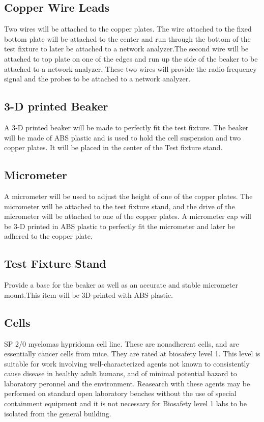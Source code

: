 \documentclass[journal]{IEEEtran}
\begin{document}
\subsection{Copper Wire Leads}
Two wires will be attached to the copper plates. The wire attached to the fixed bottom plate will be attached to the center and run through the bottom of the test fixture to later be attached to a network analyzer.The second wire will be attached to top plate on one of the edges and run up the side of the beaker to be attached to a network analyzer. These two wires will provide the radio frequency signal and the probes to be attached to a network analyzer.

\subsection{3-D printed Beaker}
A 3-D printed beaker will be made to perfectly fit the test fixture. The beaker will be made of ABS plastic and is used to hold the cell suspension and two copper plates. It will be placed in the center of the Test fixture stand.

\subsection{Micrometer}
A micrometer will be used to adjust the height of one of the copper plates. The micrometer will be attached to the test fixture stand, and the drive of the micrometer will be attached to one of the copper plates. A micrometer cap will be 3-D printed in ABS plastic to perfectly fit the micrometer and later be adhered to the copper plate.

\subsection{Test Fixture Stand}
Provide a base for the beaker as well as an accurate and stable micrometer mount.This item will be 3D printed with ABS plastic.

\subsection{Cells}
SP 2/0 myelomas hypridoma cell line. These are nonadherent cells, and are essentially cancer cells from mice.\cite{mouse-myeloma-hybridoma-strain} They are rated at biosafety level 1. This level is suitable for work involving well-characterized agents not known to consistently cause disease in healthy adult humans, and of minimal potential hazard to laboratory peronnel and the environment. Reasearch with these agents may be performed on standard open laboratory benches without the use of special containment equipment and it is not necessary for Biosafety level 1 labs to be isolated from the general building.\cite{biosafety-levels}
\end{document}
